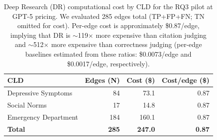 \begin{table}[H]
\centering
\caption[Deep Research computational cost]{Deep Research (DR) computational cost by CLD for the RQ3 pilot at GPT-5 pricing. We evaluated 285 edges total (TP+FP+FN; TN omitted for cost). Per-edge cost is approximately \$0.87/edge, implying that DR is $\sim$119$\times$ more expensive than citation judging and $\sim$512$\times$ more expensive than correctness judging (per-edge baselines estimated from these ratios: \$0.0073/edge and \$0.0017/edge, respectively).}
\label{tab:dr_cost}
\begin{tabular}{lrrr}
\hline
\textbf{CLD} & \textbf{Edges (N)} & \textbf{Cost (\$)} & \textbf{Cost/edge (\$)} \\
\hline
Depressive Symptoms & 84  & 73.1  & 0.87 \\
Social Norms        & 17  & 14.8  & 0.87 \\
Emergency Department & 184 & 160.1 & 0.87 \\
\hline
\textbf{Total} & \textbf{285} & \textbf{247.0} & \textbf{0.87} \\
\hline
\end{tabular}
\end{table}
